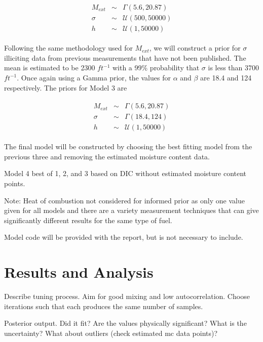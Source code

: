 \documentclass[11pt]{article}
\begin{document}
\begin{align}
\begin{array}{ccc}
M_{ext} &\sim& \Gamma(5.6,20.87) \\
\sigma &\sim& \mathcal{U}(500,50000) \\
h &\sim& \mathcal{U}(1,50000)
\end{array}
\label{eq:mod2_priors}
\end{align}

Following the same methodology used for $M_{ext}$, we will construct a prior for $\sigma$ illiciting data from previous measurements that have not been published. The mean is estimated to be 2300 $ft^{-1}$ with a 99\% probability that $\sigma$ is less than 3700 $ft^{-1}$. Once again using a Gamma prior, the values for $\alpha$ and $\beta$ are 18.4 and 124 respectively. The priors for Model 3 are 

\begin{align}
\begin{array}{ccc}
M_{ext} &\sim& \Gamma(5.6,20.87) \\
\sigma &\sim& \Gamma(18.4,124) \\
h &\sim& \mathcal{U}(1,50000)
\end{array}
\label{eq:mod2_priors}
\end{align}

The final model will be constructed by choosing the best fitting model from the previous three and removing the estimated moisture content data.

Model 4 best of 1, 2, and 3 based on DIC without estimated moisture content points.

Note: Heat of combustion not considered for informed prior as only one value given for all models and there are a variety measurement techniques that can give significantly different results for the same type of fuel.

Model code will be provided with the report, but is not necessary to include.


\section{Results and Analysis}
\label{sec:res}

Describe tuning process. Aim for good mixing and low autocorrelation. Choose iterations such that each produces the same number of samples.

Posterior output. Did it fit? Are the values physically significant? What is the uncertainty? What about outliers (check estimated mc data points)? 
\end{document}
